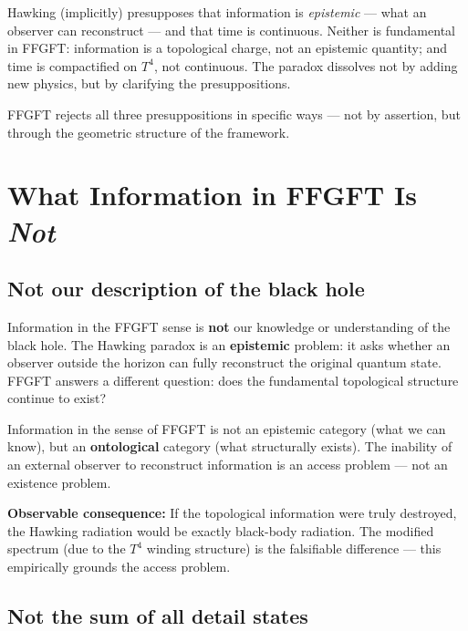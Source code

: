 \begin{wichtig}
Hawking (implicitly) presupposes that information is \emph{epistemic} --- what an observer can reconstruct --- and that time is continuous. Neither is fundamental in FFGFT: information is a topological charge, not an epistemic quantity; and time is compactified on $T^4$, not continuous. The paradox dissolves not by adding new physics, but by clarifying the presuppositions.
\end{wichtig}

FFGFT rejects all three presuppositions in specific ways --- not by assertion, but through the geometric structure of the framework.

\section{What Information in FFGFT Is \emph{Not}}

\subsection{Not our description of the black hole}

Information in the FFGFT sense is \textbf{not} our knowledge or understanding of the black hole. The Hawking paradox is an \textbf{epistemic} problem: it asks whether an observer outside the horizon can fully reconstruct the original quantum state. FFGFT answers a different question: does the fundamental topological structure continue to exist?

\begin{wichtig}
Information in the sense of FFGFT is not an epistemic category (what we can know), but an \textbf{ontological} category (what structurally exists). The inability of an external observer to reconstruct information is an access problem --- not an existence problem.

\textbf{Observable consequence:} If the topological information were truly destroyed, the Hawking radiation would be exactly black-body radiation. The modified spectrum (due to the $T^4$ winding structure) is the falsifiable difference --- this empirically grounds the access problem.
\end{wichtig}

\subsection{Not the sum of all detail states}

